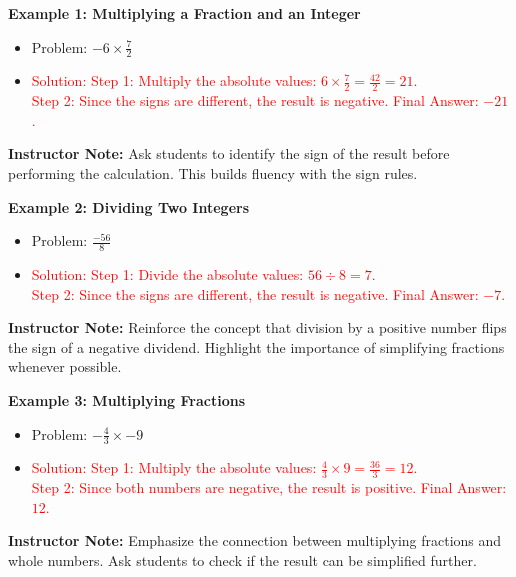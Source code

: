 \documentclass[11pt]{article}
\begin{document}
\vspace{1em}

\begin{tcolorbox}[colframe=black!60, colback=white, 
coltitle=black, colbacktitle=black!15, fonttitle=\bfseries\Large, 
title=Examples (Part 1), halign title=center, left=10pt, right=10pt, top=10pt, bottom=5pt]
\textbf{Example 1: Multiplying a Fraction and an Integer}
\begin{itemize}
    \item Problem: \( -6 \times \frac{7}{2} \)
    \item \textcolor{red}{Solution: Step 1: Multiply the absolute values: \( 6 \times \frac{7}{2} = \frac{42}{2} = 21 \). \\ 
    Step 2: Since the signs are different, the result is negative. Final Answer: \( -21 \).}
\end{itemize}

{\color{blue} \textbf{Instructor Note:} Ask students to identify the sign of the result before performing the calculation. This builds fluency with the sign rules.}

\textbf{Example 2: Dividing Two Integers}
\begin{itemize}
    \item Problem: \( \frac{-56}{8} \)
    \item \textcolor{red}{Solution: Step 1: Divide the absolute values: \( 56 \div 8 = 7 \). \\ 
    Step 2: Since the signs are different, the result is negative. Final Answer: \( -7 \).}
\end{itemize}

{\color{blue} \textbf{Instructor Note:} Reinforce the concept that division by a positive number flips the sign of a negative dividend. Highlight the importance of simplifying fractions whenever possible.}

\textbf{Example 3: Multiplying Fractions}
\begin{itemize}
    \item Problem: \( -\frac{4}{3} \times -9 \)
    \item \textcolor{red}{Solution: Step 1: Multiply the absolute values: \( \frac{4}{3} \times 9 = \frac{36}{3} = 12 \). \\ 
    Step 2: Since both numbers are negative, the result is positive. Final Answer: \( 12 \).}
\end{itemize}

{\color{blue} \textbf{Instructor Note:} Emphasize the connection between multiplying fractions and whole numbers. Ask students to check if the result can be simplified further.}
\end{tcolorbox}
\end{document}
